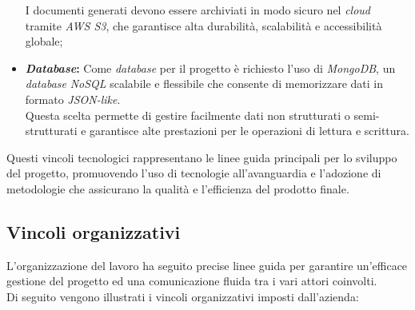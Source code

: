 \begin{itemize}
    I documenti generati devono essere archiviati in modo sicuro nel \textit{cloud} tramite \textit{AWS S3}, che garantisce alta durabilità, scalabilità e accessibilità globale;
    \pagebreak
    \item \textbf{\textit{Database}:} Come \textit{database} per il progetto è richiesto l’uso di \textit{MongoDB}, un \textit{database} \textit{NoSQL} scalabile e flessibile che consente di memorizzare dati in formato \textit{JSON-like}. \\
    Questa scelta permette di gestire facilmente dati non strutturati o semi-strutturati e garantisce alte prestazioni per le operazioni di lettura e scrittura.\\
\end{itemize}

\noindent Questi vincoli tecnologici rappresentano le linee guida principali per lo sviluppo del progetto, promuovendo l’uso di tecnologie all’avanguardia e l’adozione di metodologie che assicurano la qualità e l’efficienza del prodotto finale.

\subsection{Vincoli organizzativi}
\label{subsec:vincoli-organizzativi}

L’organizzazione del lavoro ha seguito precise linee guida per garantire un’efficace gestione del progetto ed una comunicazione fluida tra i vari attori coinvolti.\\

\noindent Di seguito vengono illustrati i vincoli organizzativi imposti dall'azienda:

